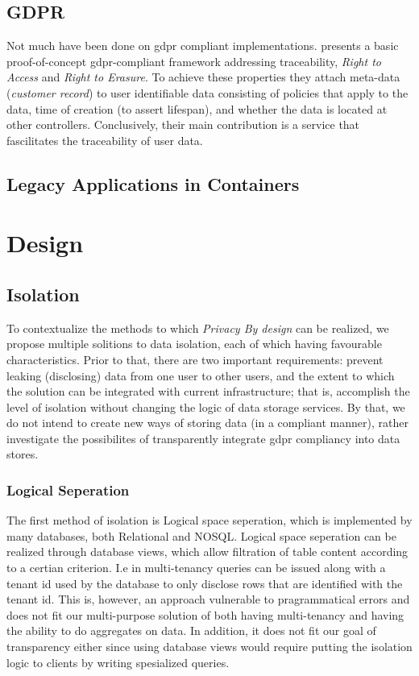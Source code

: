 \documentclass[USenglish]{uit-thesis}
\begin{document}
\section{GDPR}
Not much have been done on \gls{gdpr} compliant implementations.
\cite{danishguy} presents a basic proof-of-concept \gls{gdpr}-compliant framework addressing
traceability, \textit{Right to Access} and \textit{Right to Erasure}.
To achieve these properties they attach meta-data (\textit{customer record}) to user identifiable data consisting of
policies that apply to the data, time of creation (to assert lifespan), and
whether the data is located at other controllers.
Conclusively, their main contribution is a service that fascilitates
the traceability of user data.

\section{Legacy Applications in Containers}


\chapter{Design}
\section{Isolation}
To contextualize the methods to which \textit{Privacy By design} can be realized, we
propose multiple solitions to data isolation, each of which having favourable characteristics.
Prior to that, there are two important requirements: prevent leaking (disclosing) data
from one user to other users, and the extent to which the solution can be
integrated with current infrastructure; that is, accomplish the level of isolation
without changing the logic of data storage services.
By that, we do not intend to create new ways of storing data (in a compliant manner),
rather investigate the possibilites of transparently integrate \gls{gdpr} compliancy
into data stores.

\subsection{Logical Seperation}
The first method of isolation is Logical space seperation, which is implemented
by many databases, both Relational and NOSQL.
Logical space seperation can be realized through database views, which
allow filtration of table content according to a certian criterion.
I.e in multi-tenancy queries can be issued along with a tenant id used by the database
to only disclose rows that are identified with the tenant id.
This is, however, an approach vulnerable to pragrammatical errors and does not fit our
multi-purpose solution of both having multi-tenancy and having the ability to do aggregates
on data.
In addition, it does not fit our goal of transparency either since using
database views would require putting the isolation logic to clients by writing spesialized
queries.
\end{document}
